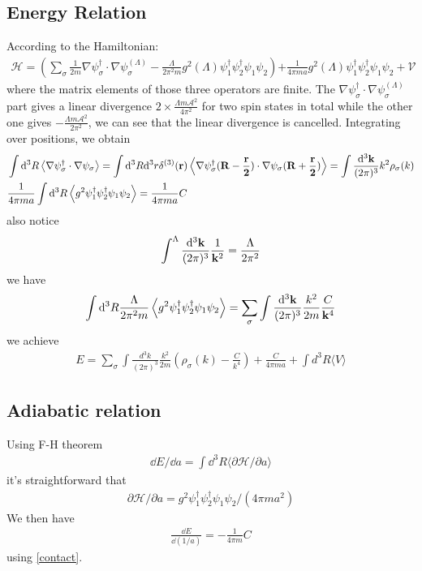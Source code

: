 \documentclass{article}
\newcommand{\calA}{\mathcal{A}}
\newcommand{\mme}[1]{\frac{\dd^3\vb{#1}}{(2\pi)^3}}
\begin{document}
    \subsection{Energy Relation}
    According to the Hamiltonian: 
    \begin{align}
    \mathcal{H} = \left(\sum_{\sigma} \frac {1} {2 m} \nabla \psi_{\sigma}^{\dagger} \cdot \nabla \psi_{\sigma}^{(\Lambda)} - \frac {\Lambda} {2 \pi^{2} m} g^{2}(\Lambda) \psi_{1}^{\dagger} \psi_{2}^{\dagger} \psi_{1} \psi_{2}\right){+ \frac {1} {4 \pi m a} g^{2}(\Lambda) \psi_{1}^{\dagger} \psi_{2}^{\dagger} \psi_{1} \psi_{2} + \mathcal{V}}
    \end{align}
    where the matrix elements of those three operators are finite. The $\nabla \psi_{\sigma}^{\dagger} \cdot \nabla \psi_{\sigma}^{(\Lambda)}$ part gives a linear divergence $2\times\frac{\Lambda  m\calA^2}{4 \pi ^2}$ for two spin states in total while the other one gives $-\frac{\Lambda m\calA^2}{2\pi^2}$, we can see that the linear divergence is cancelled. Integrating over positions, we obtain
    \begin{align}
        &\int\dd^3R\expval{\nabla \psi_{\sigma}^{\dagger} \cdot \nabla \psi_{\sigma}}=\int\dd^3R\dd^3r\delta^{(3)}(\vb{r})\expval{\nabla \psi_{\sigma}^{\dagger}(\vb{R-\frac{r}{2}}) \cdot \nabla \psi_{\sigma}(\vb{R+\frac{r}{2}})} =\int\mme{k}k^2\rho_\sigma(k)\\
        &\frac {1} {4 \pi m a} \int\dd^3R \expval{g^{2}\psi_{1}^{\dagger} \psi_{2}^{\dagger} \psi_{1} \psi_{2}}=\frac {1} {4 \pi m a}C
    \end{align}
    also notice
    \begin{align}
        \int^\Lambda\mme{k}\frac{1}{\vb{k}^2}=\frac{\Lambda}{2\pi^2}
    \end{align}
    we have
    \begin{align}
        \int\dd^3R\frac {\Lambda} {2 \pi^{2} m} \expval{g^{2} \psi_{1}^{\dagger} \psi_{2}^{\dagger} \psi_{1} \psi_{2}}=\sum_\sigma\int\mme{k}\frac{k^2}{2m}\frac{C}{\vb{k}^4}
    \end{align}
    we achieve 
    \begin{align}
        E = \sum_{\sigma} \int \frac {d^{3} k} {(2 \pi)^{3}} \frac {k^{2}} {2 m} \left(\rho_{\sigma} (k) - \frac {C} {k^{4}}\right) + \frac {C} {4 \pi m a}+ \int d^{3} R \langle V \rangle
    \end{align}
    \subsection{Adiabatic relation}
    Using F-H theorem
    \begin{align}
        \dd E / \dd a = \int \dd^{3} R \langle \partial \mathcal{H} / \partial a \rangle
    \end{align}
    it's straightforward that
    \begin{align}
        \partial \mathcal{H} / \partial a = g^{2} \psi_{1}^{\dagger} \psi_{2}^{\dagger} \psi_{1} \psi_{2} / (4 \pi m a^{2})
    \end{align}
    We then have 
    \begin{align}
        \frac {\dd E} {\dd (1 / a)} = - \frac {1} {4 \pi m} C
    \end{align}
    using \eqref{contact}. 
\end{document}
